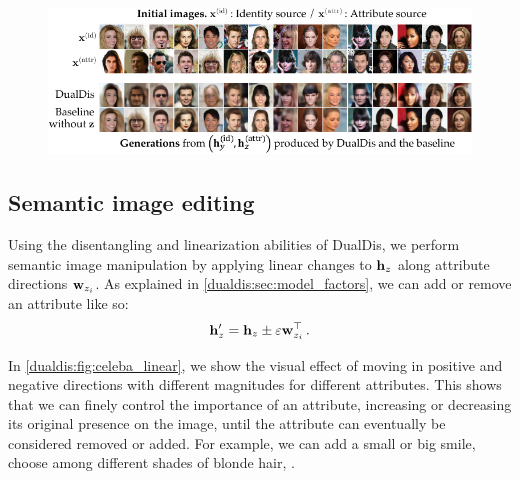 \begin{figure}[p]
\begin{subfigure}[b]{0.57\linewidth}
    \centering
    \label{dualdis:fig:norb}
    \end{subfigure}
    \label{dualdis:fig:yale_norb}
\end{figure}
\begin{figure}[p]
    \centering
    \includegraphics[width=\linewidth]{images/dualdis_celeba_mix.pdf}
    \label{dualdis:fig:celeba_mix}
\end{figure}

\subsection{Semantic image editing}

Using the disentangling and linearization abilities of DualDis, we perform semantic image manipulation by applying linear changes to $\mathbf{h}_z$ along attribute directions $\mathbf{w}_{z_i}$. As explained in \autoref{dualdis:sec:model_factors}, we can add or remove an attribute like so:
\begin{equation}
    \mathbf{h}_z' = \mathbf{h}_z \pm \varepsilon \mathbf{w}_{z_i}^\top\,.
\end{equation}

In \autoref{dualdis:fig:celeba_linear}, we show the visual effect of moving in positive and negative directions with different magnitudes for different attributes. This shows that we can finely control the importance of an attribute, increasing or decreasing its original presence on the image, until the attribute can eventually be considered removed or added. For example, we can add a small or big smile, choose among different shades of blonde hair, \etc.

